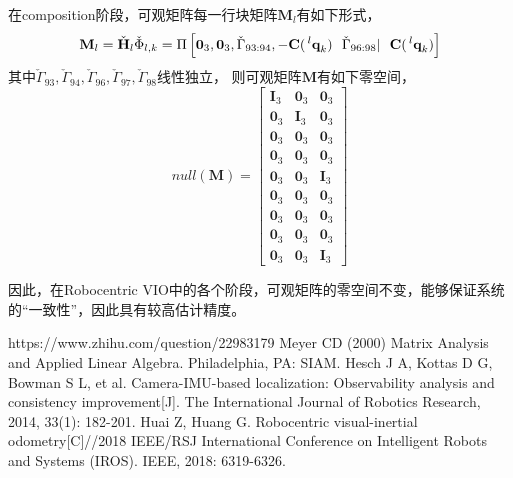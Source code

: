 \documentclass{article}
\begin{document}
在composition阶段，可观矩阵每一行块矩阵$\textbf{M}_l$有如下形式，
\begin{equation}
    \textbf{M}_l=\check{\textbf{H}}_{l}\check{\Phi}_{l,k}
    =\Pi\left[\textbf{0}_{3},\textbf{0}_{3},\check{\Gamma}_{93:94},-\textbf{C}(\sideset{^l}{}{\mathop{\textbf{q}_k}})\ \ 
    \check{\Gamma}_{96:98}|\ \ \textbf{C}(\sideset{^l}{}{\mathop{\textbf{q}_k}})\right]
\end{equation}
其中$\check{\Gamma}_{93},\check{\Gamma}_{94},\check{\Gamma}_{96},\check{\Gamma}_{97},\check{\Gamma}_{98}$线性独立，
则可观矩阵$\textbf{M}$有如下零空间，
\begin{equation}
    null(\textbf{M})=\left[
        \begin{array}{ccc}
            \textbf{I}_3&\textbf{0}_{3}&\textbf{0}_{3}\\
            \textbf{0}_3&\textbf{I}_{3}&\textbf{0}_{3}\\
            \textbf{0}_3&\textbf{0}_{3}&\textbf{0}_{3}\\
            \textbf{0}_3&\textbf{0}_{3}&\textbf{0}_{3}\\
            \textbf{0}_3&\textbf{0}_{3}&\textbf{I}_{3}\\
            \textbf{0}_3&\textbf{0}_{3}&\textbf{0}_{3}\\
            \textbf{0}_3&\textbf{0}_{3}&\textbf{0}_{3}\\
            \textbf{0}_3&\textbf{0}_{3}&\textbf{0}_{3}\\
            \textbf{0}_3&\textbf{0}_{3}&\textbf{I}_{3}
        \end{array}\right]
\end{equation}

\par
因此，在Robocentric VIO中的各个阶段，可观矩阵的零空间不变，能够保证系统的“一致性”，因此具有较高估计精度。



\begin{thebibliography}{99}  
    https://www.zhihu.com/question/22983179
    Meyer CD (2000) Matrix Analysis and Applied Linear Algebra. Philadelphia, PA: SIAM.
    \bibitem{consistency} Hesch J A, Kottas D G, Bowman S L, et al. Camera-IMU-based localization: Observability analysis and consistency improvement[J]. The International Journal of Robotics Research, 2014, 33(1): 182-201.
    \bibitem{rvio} Huai Z, Huang G. Robocentric visual-inertial odometry[C]//2018 IEEE/RSJ International Conference on Intelligent Robots and Systems (IROS). IEEE, 2018: 6319-6326.
\end{thebibliography}
\end{document}
